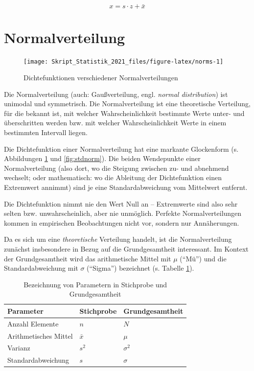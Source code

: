 \documentclass[
  11pt,
  ngerman,
  a4paper,
]{report}
\begin{document}
\[
  x=s\cdot z+\bar{x}
  \label{eq:zrev}
\]

\hypertarget{normalverteilung}{%
\section{Normalverteilung}\label{normalverteilung}}

\begin{figure}[b]

{\centering \texttt{[image: Skript\_Statistik\_2021\_files/figure-latex/norms-1]} 

}

\caption{Dichtefunktionen verschiedener Normalverteilungen}\label{fig:norms}
\end{figure}

Die Normalverteilung (auch: Gaußverteilung, engl. \emph{normal distribution}) ist unimodal und symmetrisch. Die Normalverteilung ist eine theoretische Verteilung, für die bekannt ist, mit welcher Wahrscheinlichkeit bestimmte Werte unter- und überschritten werden bzw. mit welcher Wahrscheinlichkeit Werte in einem bestimmten Intervall liegen.

Die Dichtefunktion einer Normalverteilung hat eine markante Glockenform (s. Abbildungen \ref{fig:norms} und \ref{fig:stdnorm}). Die beiden Wendepunkte einer Normalverteilung (also dort, wo die Steigung zwischen zu- und abnehmend wechselt; oder mathematisch: wo die Ableitung der Dichtefunktion einen Extremwert annimmt) sind je eine Standardabweichung vom Mittelwert entfernt.

Die Dichtefunktion nimmt nie den Wert Null an -- Extremwerte sind also sehr selten bzw. unwahrscheinlich, aber nie unmöglich. Perfekte Normalverteilungen kommen in empirischen Beobachtungen nicht vor, sondern nur Annäherungen.

Da es sich um eine \emph{theoretische} Verteilung handelt, ist die Normalverteilung zunächst insbesondere in Bezug auf die Grundgesamtheit interessant. Im Kontext der Grundgesamtheit wird das arithmetische Mittel mit \(\mu\) (\enquote{Mü}) und die Standardabweichung mit \(\sigma\) (\enquote{Sigma}) bezeichnet (s. Tabelle \ref{tab:param}).

\begin{table}

\caption{\label{tab:param}Bezeichnung von Parametern in Stichprobe und Grundgesamtheit}
\centering
\begin{tabular}[t]{lll}
\toprule
Parameter & Stichprobe & Grundgesamtheit\\
\midrule
Anzahl Elemente & $n$ & $N$\\
Arithmetisches Mittel & $\bar{x}$ & $\mu$\\
Varianz & $s^2$ & $\sigma^2$\\
Standardabweichung & $s$ & $\sigma$\\
\bottomrule
\end{tabular}
\end{table}
\end{document}
